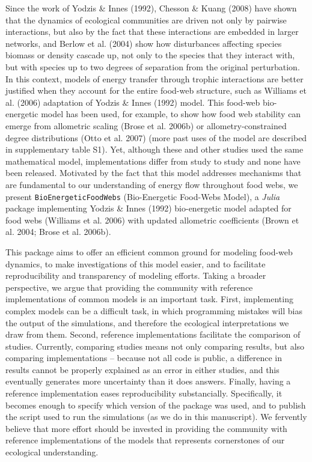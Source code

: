 \documentclass[12pt]{article}
\begin{document}
Since the work of Yodzis \& Innes (1992), Chesson \& Kuang (2008) have
shown that the dynamics of ecological communities are driven not only by
pairwise interactions, but also by the fact that these interactions are
embedded in larger networks, and Berlow et al. (2004) show how
disturbances affecting species biomass or density cascade up, not only
to the species that they interact with, but with species up to two
degrees of separation from the original perturbation. In this context,
models of energy transfer through trophic interactions are better
justified when they account for the entire food-web structure, such as
Williams et al. (2006) adaptation of Yodzis \& Innes (1992) model. This
food-web bio-energetic model has been used, for example, to show how
food web stability can emerge from allometric scaling (Brose et al.
2006b) or allometry-constrained degree distributions (Otto et al. 2007)
(more past uses of the model are described in supplementary table S1).
Yet, although these and other studies used the same mathematical model,
implementations differ from study to study and none have been released.
Motivated by the fact that this model addresses mechanisms that are
fundamental to our understanding of energy flow throughout food webs, we
present \texttt{BioEnergeticFoodWebs} (Bio-Energetic Food-Webs Model), a
\emph{Julia} package implementing Yodzis \& Innes (1992) bio-energetic
model adapted for food webs (Williams et al. 2006) with updated
allometric coefficients (Brown et al. 2004; Brose et al. 2006b).

This package aims to offer an efficient common ground for modeling
food-web dynamics, to make investigations of this model easier, and to
facilitate reproducibility and transparency of modeling efforts. Taking
a broader perspective, we argue that providing the community with
reference implementations of common models is an important task. First,
implementing complex models can be a difficult task, in which
programming mistakes will bias the output of the simulations, and
therefore the ecological interpretations we draw from them. Second,
reference implementations facilitate the comparison of studies.
Currently, comparing studies means not only comparing results, but also
comparing implementations -- because not all code is public, a
difference in results cannot be properly explained as an error in either
studies, and this eventually generates more uncertainty than it does
answers. Finally, having a reference implementation eases
reproducibility substancially. Specifically, it becomes enough to
specify which version of the package was used, and to publish the script
used to run the simulations (as we do in this manuscript). We fervently
believe that more effort should be invested in providing the community
with reference implementations of the models that represents
cornerstones of our ecological understanding.
\end{document}
